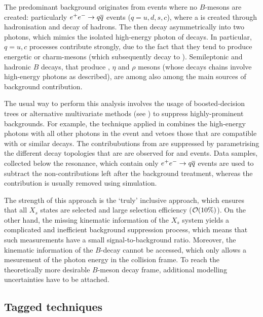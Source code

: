 The predominant background originates from events where no $B$-mesons are created: particularly $e^+e^-\rightarrow q\overline q$ events ($q={u,d,s,c}$), where a \piz is created through hadronisation and decay of hadrons.
The \piz then decay asymmetrically into two photons, which mimics the isolated high-energy photon of \BtoXsgamma decays.
In particular, $q={u,c}$ processes contribute strongly, due to the fact that they tend to produce energetic \piz or charm-mesons (which subsequently decay to \piz).
Semileptonic and hadronic $B$ decays, that produce \piz, $\eta$ and $\rho$ mesons (whose decays chains involve high-energy photons as described), are among also among the main sources of background contribution.

The usual way to perform this analysis involves the usage of boosted-decision trees or alternative multivariate methods (see ) to suppress highly-prominent backgrounds.
For example, the technique applied in \cite{CLEO:2001gsa,Belle:2009nth} combines the high-energy photons with all other photons in the event and vetoes those that are compatible with \piz or similar decays.
The contribubutions from \epem\ra\qqbar are suppressed by parametrising the different decay topologies that are are observed for \BB and \qqbar events.
Data samples, collected below the \FourS resonance, which contain only $e^+e^-\rightarrow q\overline q$ events are used to subtract the non-\BB contributions left after the background treatment, 
whereas the \BB contribution is usually removed using simulation.

The strength of this approach is the `truly' inclusive approach, which ensures that all $X_s$ states are selected and large selection efficiency (${\cal O}(10\%)$).
On the other hand, the missing kinematic information of the $X_s$ system yields a complicated and inefficient background suppression process, which means that such measurements have a small signal-to-background ratio.
Moreover, the kinematic information of the $B$-decay cannot be accessed, which only allows a mesurement of the photon energy in the \epem collision frame.
To reach the theoretically more desirable $B$-meson decay frame, additional modelling uncertainties have to be attached.


\subsection{Tagged techniques}

